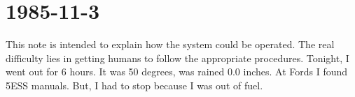 \documentclass{article}
\begin{document}
\section*{1985{-}11{-}3}
This note is intended to explain how the system could be operated. The real difficulty lies in getting humans to follow the appropriate procedures. Tonight, I went out for 6 hours. It was 50 degrees, was rained 0.0 inches. At Fords I found 5ESS manuals. But, I had to stop because I was out of fuel.
\end{document}
